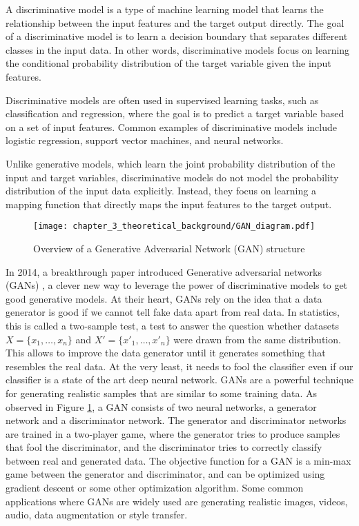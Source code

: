 A discriminative model is a type of machine learning model that learns the relationship between the input features and the target output directly. The goal of a discriminative model is to learn a decision boundary that separates different classes in the input data. In other words, discriminative models focus on learning the conditional probability distribution of the target variable given the input features.

Discriminative models are often used in supervised learning tasks, such as classification and regression, where the goal is to predict a target variable based on a set of input features. Common examples of discriminative models include logistic regression, support vector machines, and neural networks.

Unlike generative models, which learn the joint probability distribution of the input and target variables, discriminative models do not model the probability distribution of the input data explicitly. Instead, they focus on learning a mapping function that directly maps the input features to the target output.

\begin{figure}[h]
	\centering
	\texttt{[image: chapter\_3\_theoretical\_background/GAN\_diagram.pdf]}
	\caption{Overview of a Generative Adversarial Network (GAN) structure}
	\label{fig:chapter_3_theoretical_background/GAN}
\end{figure}

In 2014, a breakthrough paper introduced Generative adversarial networks (GANs) \cite{goodfellow2020generative}, a clever new way to leverage the power of discriminative models to get good generative models. At their heart, GANs rely on the idea that a data generator is good if we cannot tell fake data apart from real data. In statistics, this is called a two-sample test, a test to answer the question whether datasets $X=\{x_1,\ldots, x_n\}$ and $X'=\{x'_1,\ldots, x'_n\}$ were drawn from the same distribution. This allows to improve the data generator until it generates something that resembles the real data. At the very least, it needs to fool the classifier even if our classifier is a state of the art deep neural network. GANs are a powerful technique for generating realistic samples that are similar to some training data. As observed in Figure \ref{fig:chapter_3_theoretical_background/GAN}, a GAN consists of two neural networks, a generator network and a discriminator network. The generator and discriminator networks are trained in a two-player game, where the generator tries to produce samples that fool the discriminator, and the discriminator tries to correctly classify between real and generated data. The objective function for a GAN is a min-max game between the generator and discriminator, and can be optimized using gradient descent or some other optimization algorithm. Some common applications where GANs are widely used are generating realistic images, videos, audio, data augmentation or style transfer.

